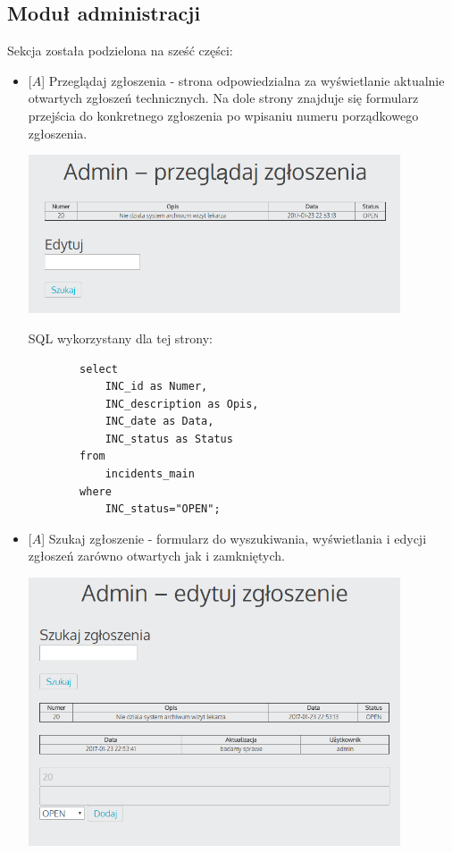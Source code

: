 \documentclass[10pt,a4paper]{article}
\begin{document}
\subsection {Moduł administracji}
Sekcja została podzielona na sześć części:
	\begin{itemize}
		\item $[A$] Przeglądaj zgłoszenia - strona odpowiedzialna za wyświetlanie aktualnie otwartych zgłoszeń technicznych. Na dole strony znajduje się formularz przejścia do konkretnego zgłoszenia po wpisaniu numeru porządkowego zgłoszenia.
		
		\includegraphics[width=11cm]{10}
		
		SQL wykorzystany dla tej strony:
		\begin{lstlisting}
		select 
			INC_id as Numer, 
			INC_description as Opis, 
			INC_date as Data, 
			INC_status as Status 
		from 
			incidents_main 
		where  
			INC_status="OPEN";
		\end{lstlisting}
		\newpage
		\item $[A$] Szukaj zgłoszenie - formularz do wyszukiwania, wyświetlania i edycji zgłoszeń zarówno otwartych jak i zamkniętych.
		
			\includegraphics[width=11cm]{11}
		

\end{itemize}
\end{document}
